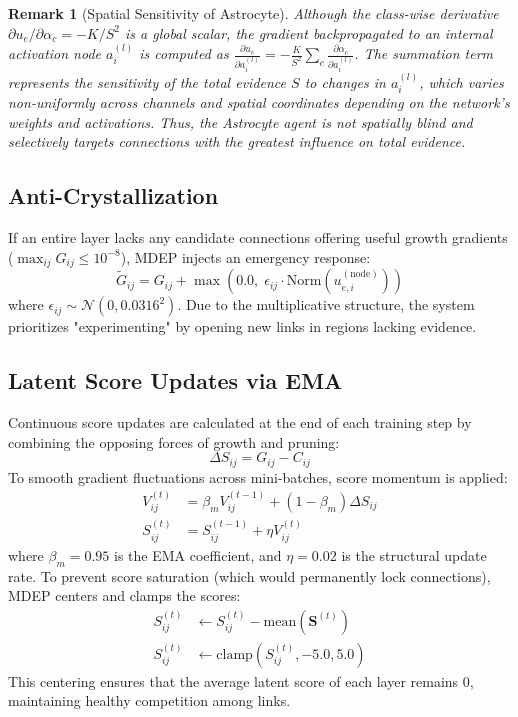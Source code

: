 \documentclass[11pt, a4paper]{article}
\newtheorem{remark}{Remark}
\begin{document}
\begin{remark}[Spatial Sensitivity of Astrocyte]
Although the class-wise derivative $\partial u_e / \partial \alpha_c = -K/S^2$ is a global scalar, the gradient backpropagated to an internal activation node $a_i^{(l)}$ is computed as $\frac{\partial u_e}{\partial a_i^{(l)}} = -\frac{K}{S^2} \sum_c \frac{\partial \alpha_c}{\partial a_i^{(l)}}$. The summation term represents the sensitivity of the total evidence $S$ to changes in $a_i^{(l)}$, which varies non-uniformly across channels and spatial coordinates depending on the network's weights and activations. Thus, the Astrocyte agent is not spatially blind and selectively targets connections with the greatest influence on total evidence.
\end{remark}

\subsection{Anti-Crystallization}\label{subsec:anti_crystal}

If an entire layer lacks any candidate connections offering useful growth gradients ($\max_{ij} G_{ij} \le 10^{-8}$), MDEP injects an emergency response:
\begin{equation}\label{eq:anti_crystal_eq}
    \tilde{G}_{ij} = G_{ij} + \max\!\left(0.0,\; \epsilon_{ij} \cdot \text{Norm}(u_{e,i}^{(\text{node})})\right)
\end{equation}
where $\epsilon_{ij} \sim \mathcal{N}(0, 0.0316^2)$. Due to the multiplicative structure, the system prioritizes "experimenting" by opening new links in regions lacking evidence.

\subsection{Latent Score Updates via EMA}\label{subsec:score_update}

Continuous score updates are calculated at the end of each training step by combining the opposing forces of growth and pruning:
\begin{equation}\label{eq:delta_S}
    \Delta S_{ij} = G_{ij} - C_{ij}
\end{equation}
To smooth gradient fluctuations across mini-batches, score momentum is applied:
\begin{align}
    V_{ij}^{(t)} &= \beta_m V_{ij}^{(t-1)} + (1 - \beta_m) \Delta S_{ij} \\
    S_{ij}^{(t)} &= S_{ij}^{(t-1)} + \eta V_{ij}^{(t)}
\end{align}
where $\beta_m = 0.95$ is the EMA coefficient, and $\eta = 0.02$ is the structural update rate. To prevent score saturation (which would permanently lock connections), MDEP centers and clamps the scores:
\begin{align}
    S_{ij}^{(t)} &\leftarrow S_{ij}^{(t)} - \text{mean}(\bm{S}^{(t)}) \\
    S_{ij}^{(t)} &\leftarrow \text{clamp}(S_{ij}^{(t)}, -5.0, 5.0)
\end{align}
This centering ensures that the average latent score of each layer remains 0, maintaining healthy competition among links.
\end{document}
